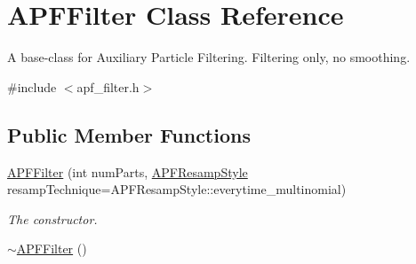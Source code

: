 \hypertarget{classAPFFilter}{}\section{A\+P\+F\+Filter Class Reference}
\label{classAPFFilter}


A base-\/class for Auxiliary Particle Filtering. Filtering only, no smoothing.  




{\ttfamily \#include $<$apf\+\_\+filter.\+h$>$}

\subsection*{Public Member Functions}
\begin{DoxyCompactItemize}
\item 
\hyperlink{classAPFFilter_a86e261db9017205973b3f8f26e004370}{A\+P\+F\+Filter} (int num\+Parts, \hyperlink{apf__filter_8h_a187a7338bc8872e7607cf1ea4ffed47b}{A\+P\+F\+Resamp\+Style} resamp\+Technique=A\+P\+F\+Resamp\+Style\+::everytime\+\_\+multinomial)
\begin{DoxyCompactList}\small\item\em The constructor. \end{DoxyCompactList}\item 
\hyperlink{classAPFFilter_ac2f814288c00c8b4f149cb4887d11f92}{$\sim$\+A\+P\+F\+Filter} ()\hypertarget{classAPFFilter_ac2f814288c00c8b4f149cb4887d11f92}{}\label{classAPFFilter_ac2f814288c00c8b4f149cb4887d11f92}


\end{DoxyCompactItemize}
